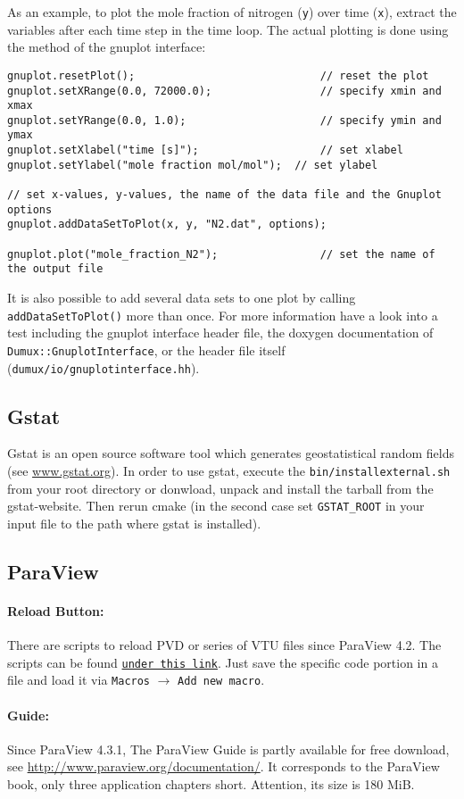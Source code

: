 As an example, to plot the mole fraction of nitrogen (\texttt{y}) over time (\texttt{x}),
extract the variables after each time step in the time loop.
The actual plotting is done using the method of the gnuplot interface:

\begin{lstlisting}[style=DumuxCode]
gnuplot.resetPlot();                             // reset the plot
gnuplot.setXRange(0.0, 72000.0);                 // specify xmin and xmax
gnuplot.setYRange(0.0, 1.0);                     // specify ymin and ymax
gnuplot.setXlabel("time [s]");                   // set xlabel
gnuplot.setYlabel("mole fraction mol/mol");  // set ylabel

// set x-values, y-values, the name of the data file and the Gnuplot options
gnuplot.addDataSetToPlot(x, y, "N2.dat", options);

gnuplot.plot("mole_fraction_N2");                // set the name of the output file
\end{lstlisting}

It is also possible to add several data sets to one plot by calling \texttt{addDataSetToPlot()} more than once.
For more information have a look into a test including the gnuplot interface header file, the doxygen documentation
of \texttt{Dumux::GnuplotInterface}, or the header file itself (\texttt{dumux/io/gnuplotinterface.hh}).


\subsection{Gstat}
Gstat is an open source software tool which generates geostatistical random fields (see \url{www.gstat.org}).
In order to use gstat, execute the \texttt{bin/installexternal.sh} from your \Dumux root
directory or donwload, unpack and install the tarball from the gstat-website.
Then rerun cmake (in the second case set \texttt{GSTAT\_ROOT} in your input file to the
path where gstat is installed).


\subsection{ParaView}
\paragraph{Reload Button:}
There are scripts to reload PVD or series of VTU files since ParaView 4.2.
The scripts can be found
\href{http://markmail.org/message/exxynsgishbvtngg#query:+page:1+mid:rxlwxs7uqrfgibyv+state:results}{\texttt{under this link}}.
Just save the specific code portion in a file and load it via \texttt{Macros} $\rightarrow$ \texttt{Add new macro}.

\paragraph{Guide:}
Since ParaView 4.3.1, The ParaView Guide is partly
available for free download, see \url{http://www.paraview.org/documentation/}.
It corresponds to the ParaView book, only three application chapters short.
Attention, its size is 180 MiB.
